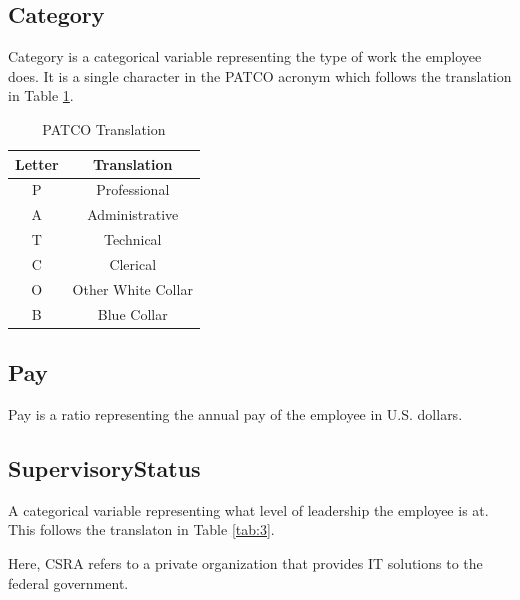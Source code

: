 \documentclass{article}
\begin{document}
    \subsection{Category}
    Category is a categorical variable representing the type of work the employee does. It is a single character in the PATCO acronym which follows the translation in Table \ref{tab:2}.

        \begin{center}
            \begin{table}
                \centering
                \begin{tabular}{ |c|c| }
                    \hline
                    Letter & Translation \\
                    \hline
                    P & Professional \\
                    A & Administrative \\
                    T & Technical \\
                    C & Clerical \\
                    O & Other White Collar \\
                    B & Blue Collar \\
                    \hline
                \end{tabular}
                \caption{PATCO Translation}
                \label{tab:2}
            \end{table}
        \end{center}

    \subsection{Pay}
    Pay is a ratio representing the annual pay of the employee in U.S. dollars.

    \subsection{SupervisoryStatus}
    A categorical variable representing what level of leadership the employee is at. This follows the translaton in Table \ref{tab:3}.
    \par
    Here, CSRA refers to a private organization that provides IT solutions to the federal government.
\end{document}
